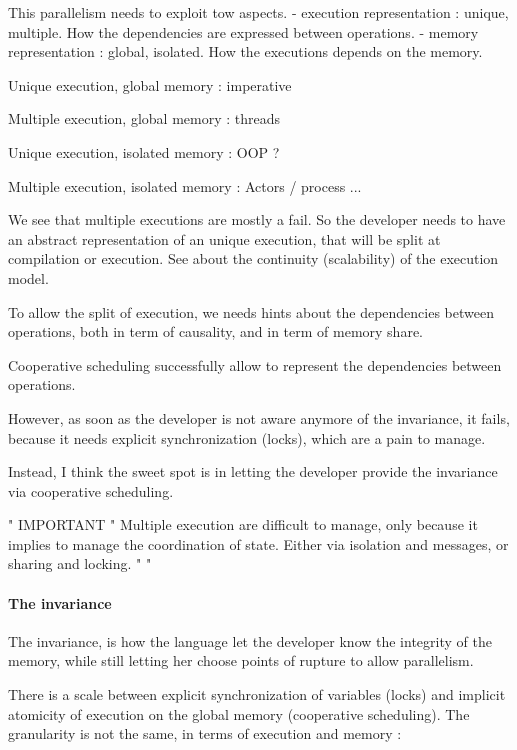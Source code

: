 This parallelism needs to exploit tow aspects.
- execution representation : unique, multiple.
How the dependencies are expressed between operations.
- memory representation : global, isolated.
How the executions depends on the memory.

Unique execution, global memory : imperative

Multiple execution, global memory : threads

Unique execution, isolated memory : OOP ?

Multiple execution, isolated memory : Actors / process ...


We see that multiple executions are mostly a fail.
So the developer needs to have an abstract representation of an unique  execution, that will be split at compilation or execution.
See about the continuity (scalability) of the execution model.

To allow the split of execution, we needs hints about the dependencies between operations, both in term of causality, and in term of memory share.

Cooperative scheduling successfully allow to represent the dependencies between operations.

However, as soon as the developer is not aware anymore of the invariance, it fails, because it needs explicit synchronization (locks), which are a pain to manage.

Instead, I think the sweet spot is in letting the developer provide the invariance via cooperative scheduling.

"                               IMPORTANT                                     "
Multiple execution are difficult to manage, only because it implies to manage the coordination of state.
Either via isolation and messages, or sharing and locking.
"                                                                             "

\paragraph{The invariance}

The invariance, is how the language let the developer know the integrity of the memory, while still letting her choose points of rupture to allow parallelism.

There is a scale between explicit synchronization of variables (locks) and implicit atomicity of execution on the global memory (cooperative scheduling).
The granularity is not the same, in terms of execution and memory :


